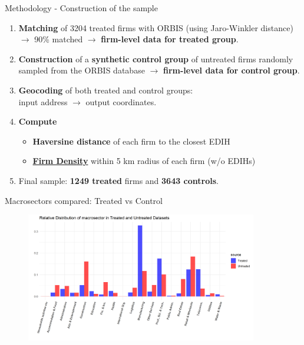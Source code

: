 \documentclass{beamer}
\begin{document}
\begin{frame}{Methodology - Construction of the sample}
    \begin{enumerate}
        \item \textbf{Matching} of 3204 treated firms with ORBIS (using Jaro-Winkler distance) $\to$ 90\% matched $\to$ \textbf{firm-level data for treated group}.  
        \item \textbf{Construction} of a \textbf{synthetic control group} of untreated firms randomly sampled from the ORBIS database $\to$ \textbf{firm-level data for control group}.
        \item \textbf{Geocoding} of both treated and control groups: \\ input address $\to$ output coordinates.
        \item \textbf{Compute} 
            \begin{itemize}
                 \item \textbf{Haversine distance} of each firm to the closest EDIH
                 \item \textbf{\hyperlink{firm_density_slide}{Firm Density}} within 5 km radius of each firm (w/o EDIHs)
            \end{itemize}
        \item Final sample: \textbf{1249 treated} firms and \textbf{3643 controls}.
    \end{enumerate}
\end{frame}

\begin{frame}{Macrosectors compared: Treated vs Control}
    \begin{figure}
        \centering
            \includegraphics[width=0.9\textwidth, trim={0 23 80 0}, clip]{../Output/macrosectorsplot_compared.png}
    \end{figure}
\end{frame}
\end{document}
